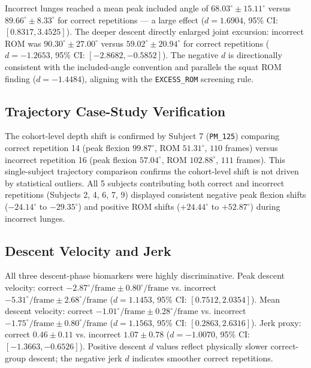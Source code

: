 Incorrect lunges reached a mean peak included angle of $\mathbf{68.03^\circ \pm 15.11^\circ}$ versus $\mathbf{89.66^\circ \pm 8.33^\circ}$ for correct repetitions — a large effect ($d = 1.6904$, 95\% CI: $[0.8317, 3.4525]$). The deeper descent directly enlarged joint excursion: incorrect ROM was $\mathbf{90.30^\circ \pm 27.00^\circ}$ versus $\mathbf{59.02^\circ \pm 20.94^\circ}$ for correct repetitions ($d = -1.2653$, 95\% CI: $[-2.8682, -0.5852]$). The negative $d$ is directionally consistent with the included-angle convention and parallels the squat ROM finding ($d = -1.4484$), aligning with the \texttt{EXCESS\_ROM} screening rule.

\subsection{Trajectory Case-Study Verification}
\label{sec:5-2-2-trajectory-case-study-verification}

The cohort-level depth shift is confirmed by Subject 7 (\texttt{PM\_125}) comparing correct repetition 14 (peak flexion $99.87^\circ$, ROM $51.31^\circ$, $110$ frames) versus incorrect repetition 16 (peak flexion $57.04^\circ$, ROM $102.88^\circ$, $111$ frames). This single-subject trajectory comparison confirms the cohort-level shift is not driven by statistical outliers. All 5 subjects contributing both correct and incorrect repetitions (Subjects 2, 4, 6, 7, 9) displayed consistent negative peak flexion shifts ($-24.14^\circ$ to $-29.35^\circ$) and positive ROM shifts ($+24.44^\circ$ to $+52.87^\circ$) during incorrect lunges.

\subsection{Descent Velocity and Jerk}
\label{sec:5-2-3-descent-velocity-and-jerk}

All three descent-phase biomarkers were highly discriminative. Peak descent velocity: correct $-2.87^\circ/\text{frame} \pm 0.80^\circ/\text{frame}$ vs. incorrect $-5.31^\circ/\text{frame} \pm 2.68^\circ/\text{frame}$ ($d = 1.1453$, 95\% CI: $[0.7512, 2.0354]$). Mean descent velocity: correct $-1.01^\circ/\text{frame} \pm 0.28^\circ/\text{frame}$ vs. incorrect $-1.75^\circ/\text{frame} \pm 0.80^\circ/\text{frame}$ ($d = 1.1563$, 95\% CI: $[0.2863, 2.6316]$). Jerk proxy: correct $0.46 \pm 0.11$ vs. incorrect $1.07 \pm 0.78$ ($d = -1.0070$, 95\% CI: $[-1.3663, -0.6526]$). Positive descent $d$ values reflect physically slower correct-group descent; the negative jerk $d$ indicates smoother correct repetitions.



